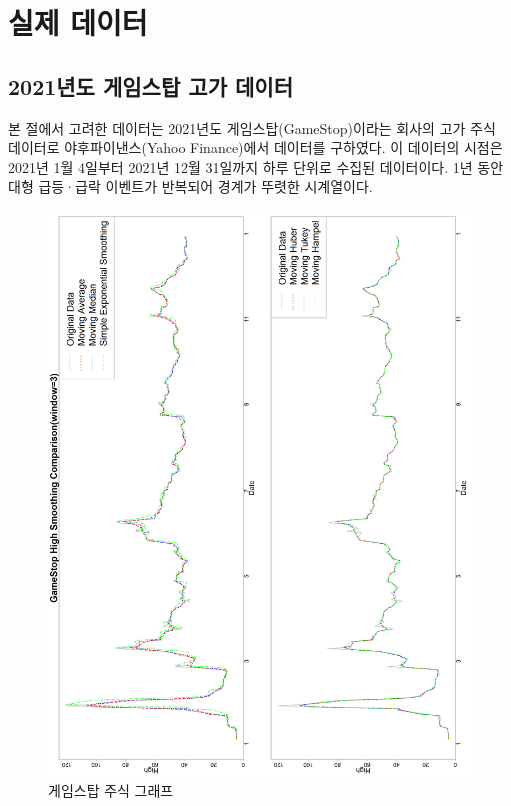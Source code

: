 \documentclass[letterpaper,12pt]{article}
\begin{document}
{%
\clearpage
\section{실제 데이터}\label{sec:examples}

\subsection{2021년도 게임스탑 고가 데이터}

본 절에서 고려한 데이터는 2021년도 게임스탑(GameStop)이라는 회사의 고가 주식 데이터로 야후파이낸스(Yahoo Finance)에서 데이터를 구하였다. 이 데이터의 시점은 2021년 1월 4일부터 2021년 12월 31일까지 하루 단위로 수집된 데이터이다. 1년 동안 대형 급등·급락 이벤트가 반복되어 경계가 뚜렷한 시계열이다. 

\begin{figure}[H]
    \centering
    \includegraphics[width=1\linewidth]{figures/gamestop3_1.png}
    \caption{게임스탑 주식 그래프}
    \label{fig:enter-label}
\end{figure}

}
\end{document}
